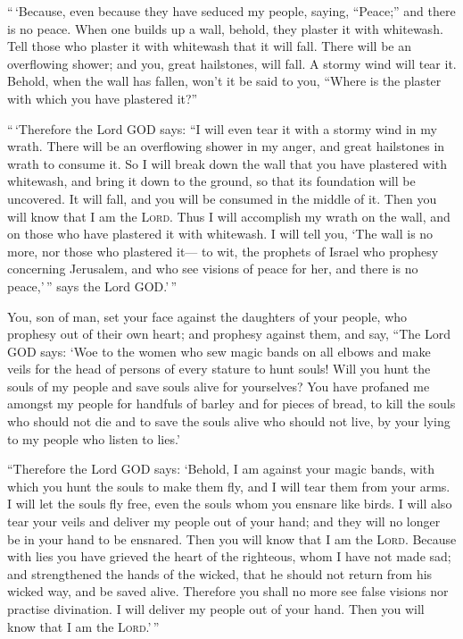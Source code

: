  ``\,`Because, even because they have seduced my people,
saying, ``Peace;'' and there is no peace. When one builds up a wall,
behold, they plaster it with whitewash.  Tell those who
plaster it with whitewash that it will fall. There will be an
overflowing shower; and you, great hailstones, will fall. A stormy wind
will tear it.  Behold, when the wall has fallen, won't it
be said to you, ``Where is the plaster with which you have plastered
it?''

 ``\,`Therefore the Lord GOD says: ``I will even tear it
with a stormy wind in my wrath. There will be an overflowing shower in
my anger, and great hailstones in wrath to consume it. 
So I will break down the wall that you have plastered with whitewash,
and bring it down to the ground, so that its foundation will be
uncovered. It will fall, and you will be consumed in the middle of it.
Then you will know that I am the \textsc{Lord}.  Thus I
will accomplish my wrath on the wall, and on those who have plastered it
with whitewash. I will tell you, `The wall is no more, nor those who
plastered it---  to wit, the prophets of Israel who
prophesy concerning Jerusalem, and who see visions of peace for her, and
there is no peace,'\,'' says the Lord GOD.'\,''

 You, son of man, set your face against the daughters of
your people, who prophesy out of their own heart; and prophesy against
them,  and say, ``The Lord GOD says: `Woe to the women
who sew magic bands on all elbows and make veils for the head of persons
of every stature to hunt souls! Will you hunt the souls of my people and
save souls alive for yourselves?  You have profaned me
amongst my people for handfuls of barley and for pieces of bread, to
kill the souls who should not die and to save the souls alive who should
not live, by your lying to my people who listen to lies.'

 ``Therefore the Lord GOD says: `Behold, I am against
your magic bands, with which you hunt the souls to make them fly, and I
will tear them from your arms. I will let the souls fly free, even the
souls whom you ensnare like birds.  I will also tear your
veils and deliver my people out of your hand; and they will no longer be
in your hand to be ensnared. Then you will know that I am the
\textsc{Lord}.  Because with lies you have grieved the
heart of the righteous, whom I have not made sad; and strengthened the
hands of the wicked, that he should not return from his wicked way, and
be saved alive.  Therefore you shall no more see false
visions nor practise divination. I will deliver my people out of your
hand. Then you will know that I am the \textsc{Lord}.'\,''

